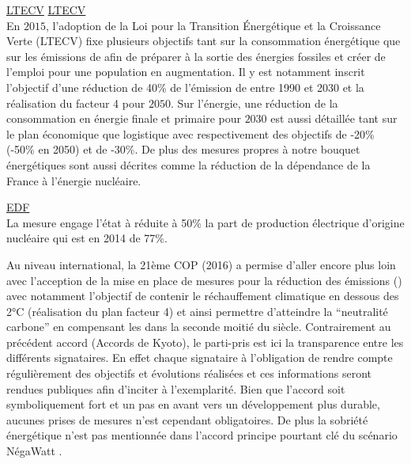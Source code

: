 \href{http://www.ecologique-solidaire.gouv.fr/loi-transition-energetique-croissance-verte}{LTECV}
\href{https://www.legifrance.gouv.fr/affichTexte.do?cidTexte=LEGITEXT000031742863&dateTexte=20170606}{LTECV}\\
En $2015$, l’adoption de la Loi pour la Transition Énergétique et la Croissance
Verte (LTECV) fixe plusieurs objectifs tant sur la consommation énergétique
que sur les émissions de  afin de préparer à la sortie des énergies fossiles
et créer de l’emploi pour une population en augmentation. Il y est notamment inscrit
l’objectif d’une réduction de 40\% de l’émission de  entre 1990 et 2030 et la
réalisation du facteur 4 pour $2050$. Sur l’énergie, une réduction de la consommation
en énergie finale et primaire pour $2030$ est aussi détaillée tant sur le plan économique
que logistique avec respectivement des objectifs de -20\% (-50\% en 2050) et de -30\%.
De plus des mesures propres à notre bouquet énergétiques sont aussi décrites comme
la réduction de la dépendance de la France à l’énergie nucléaire.

\href{https://www.edf.fr/groupe-edf/espaces-dedies/l-energie-de-a-a-z/tout-sur-l-energie/produire-de-l-electricite/le-nucleaire-en-chiffres}{EDF}\\
La mesure engage l’état à réduite à 50\% la part de production électrique d’origine nucléaire
qui est en 2014 de 77\%.


Au niveau international, la 21ème COP (2016) a permise d’aller encore plus loin avec l’acception de la mise en place
de mesures pour la réduction des émissions () avec notamment l’objectif
de contenir le réchauffement climatique en dessous des 2°C (réalisation du plan facteur 4) et ainsi permettre
d’atteindre la \enquote{neutralité carbone} en compensant les  dans la seconde moitié
du siècle. Contrairement au précédent accord (Accords de Kyoto), le parti-pris est ici
la transparence entre les différents signataires. En effet chaque signataire à l’obligation de rendre
compte régulièrement des objectifs et évolutions réalisées et ces informations seront
rendues publiques afin d’inciter à l’exemplarité. Bien que l’accord soit symboliquement
fort et un pas en avant vers un développement plus durable, aucunes prises de mesures
n’est cependant obligatoires. De plus la sobriété énergétique n’est pas mentionnée dans l’accord
principe pourtant clé du scénario NégaWatt \parencite{Salomon2012}.

